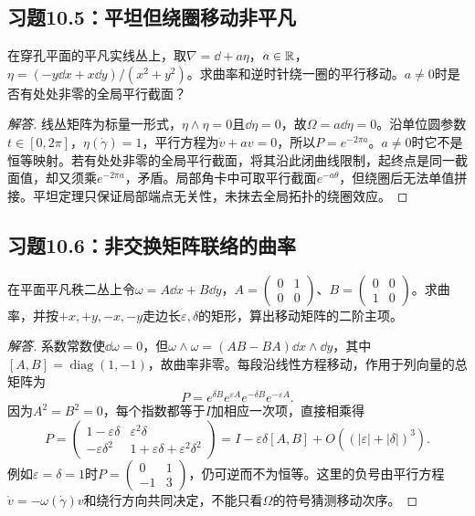 \subsection*{习题10.5：平坦但绕圈移动非平凡}
在穿孔平面的平凡实线丛上，取$\nabla=\dd+a\eta$，$a\in\mathbb{R}$，$\eta=(-y\dd x+x\dd y)/(x^2+y^2)$。求曲率和逆时针绕一圈的平行移动。$a\ne0$时是否有处处非零的全局平行截面？
\begin{proof}[解答]
线丛矩阵为标量一形式，$\eta\wedge\eta=0$且$\dd\eta=0$，故$\Omega=a\dd\eta=0$。沿单位圆参数$t\in[0,2\pi]$，$\eta(\dot\gamma)=1$，平行方程为$\dot v+av=0$，所以$P=e^{-2\pi a}$。$a\ne0$时它不是恒等映射。若有处处非零的全局平行截面，将其沿此闭曲线限制，起终点是同一截面值，却又须乘$e^{-2\pi a}$，矛盾。局部角卡中可取平行截面$e^{-a\theta}$，但绕圈后无法单值拼接。平坦定理只保证局部端点无关性，未抹去全局拓扑的绕圈效应。
\end{proof}

\subsection*{习题10.6：非交换矩阵联络的曲率}
在平面平凡秩二丛上令$\omega=A\dd x+B\dd y$，$A=\left(\begin{smallmatrix}0&1\\0&0\end{smallmatrix}\right)$、$B=\left(\begin{smallmatrix}0&0\\1&0\end{smallmatrix}\right)$。求曲率，并按$+x,+y,-x,-y$走边长$\varepsilon,\delta$的矩形，算出移动矩阵的二阶主项。
\begin{proof}[解答]
系数常数使$\dd\omega=0$，但$\omega\wedge\omega=(AB-BA)\dd x\wedge\dd y$，其中$[A,B]=\operatorname{diag}(1,-1)$，故曲率非零。每段沿线性方程移动，作用于列向量的总矩阵为
\[
 P=e^{\delta B}e^{\varepsilon A}e^{-\delta B}e^{-\varepsilon A}.
\]
因为$A^2=B^2=0$，每个指数都等于$I$加相应一次项，直接相乘得
\[
 P=\begin{pmatrix}1-\varepsilon\delta&\varepsilon^2\delta\\
 -\varepsilon\delta^2&1+\varepsilon\delta+\varepsilon^2\delta^2\end{pmatrix}
 =I-\varepsilon\delta[A,B]+O((|\varepsilon|+|\delta|)^3).
\]
例如$\varepsilon=\delta=1$时$P=\left(\begin{smallmatrix}0&1\\-1&3\end{smallmatrix}\right)$，仍可逆而不为恒等。这里的负号由平行方程$\dot v=-\omega(\dot\gamma)v$和绕行方向共同决定，不能只看$\Omega$的符号猜测移动次序。
\end{proof}

